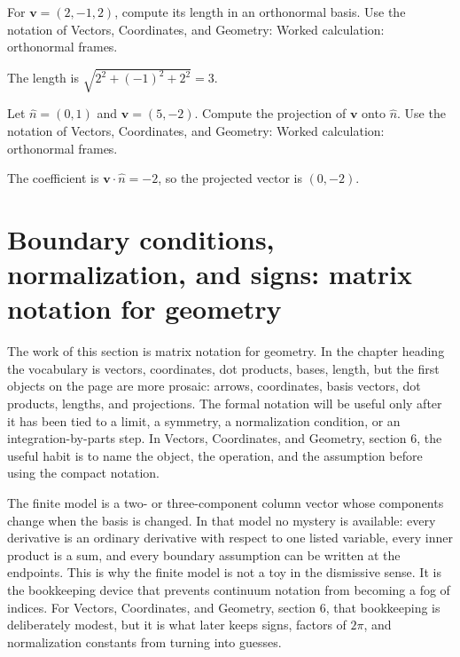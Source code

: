 \begin{exercise}
For \(\bm v=(2,-1,2)\), compute its length in an orthonormal basis.  Use the notation of Vectors, Coordinates, and Geometry: Worked calculation: orthonormal frames.
\begin{answer}
The length is \(\sqrt{2^2+(-1)^2+2^2}=3\).
\end{answer}
\end{exercise}

\begin{exercise}
Let \(\hat n=(0,1)\) and \(\bm v=(5,-2)\).  Compute the projection of \(\bm v\) onto \(\hat n\).  Use the notation of Vectors, Coordinates, and Geometry: Worked calculation: orthonormal frames.
\begin{answer}
The coefficient is \(\bm v\cdot\hat n=-2\), so the projected vector is \((0,-2)\).
\end{answer}
\end{exercise}



\section{Boundary conditions, normalization, and signs: matrix notation for geometry}

The work of this section is matrix notation for geometry.  In the chapter heading the vocabulary is vectors, coordinates, dot products, bases, length, but the first objects on the page are more prosaic: arrows, coordinates, basis vectors, dot products, lengths, and projections.  The formal notation will be useful only after it has been tied to a limit, a symmetry, a normalization condition, or an integration-by-parts step.  In Vectors, Coordinates, and Geometry, section 6, the useful habit is to name the object, the operation, and the assumption before using the compact notation.

The finite model is a two- or three-component column vector whose components change when the basis is changed.  In that model no mystery is available: every derivative is an ordinary derivative with respect to one listed variable, every inner product is a sum, and every boundary assumption can be written at the endpoints.  This is why the finite model is not a toy in the dismissive sense.  It is the bookkeeping device that prevents continuum notation from becoming a fog of indices.  For Vectors, Coordinates, and Geometry, section 6, that bookkeeping is deliberately modest, but it is what later keeps signs, factors of \(2\pi\), and normalization constants from turning into guesses.

